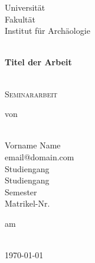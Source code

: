 \begin{titlepage}
	\centering
\Large
Universität \LaTeXe{} \\
\LaTeXe{} Fakultät\\
Institut für Archäologie \\

	\mbox{}\vspace{1\baselineskip}\\
	\sffamily

\begin{Large}
\textbf{Titel der Arbeit} \end{Large}
	\vspace{1\baselineskip}\\
	\vspace{2\baselineskip}
	\rmfamily\Large
	\textsc{Seminararbeit} 
	\vspace{2\baselineskip}\\	
 \begin{normalsize}von\end{normalsize} \\
 Vorname Name \\
 email@domain.com \\
 Studiengang \\
 Studiengang \\
 Semester \\
 Matrikel-Nr. \\
 \begin{normalsize}am\end{normalsize} \\
\today
\end{titlepage}